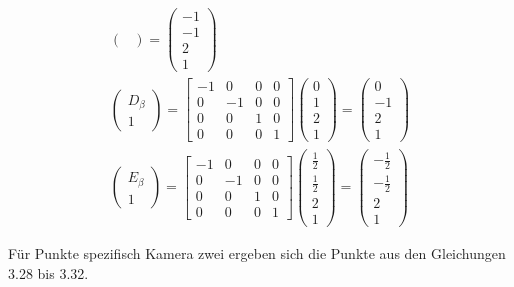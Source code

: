 \begin{gather}
\begin{pmatrix}
	\end{pmatrix}
	=
	\begin{pmatrix}
		-1\\-1\\2\\1
	\end{pmatrix}\\
	\begin{pmatrix}
		D_\beta\\1
	\end{pmatrix}
	=
	\begin{bmatrix}
		-1&0&0&0\\
		0&-1&0&0\\
		0&0&1&0\\
		0&0&0&1
	\end{bmatrix}
	\begin{pmatrix}
		0\\1\\2\\1
	\end{pmatrix}
	=
	\begin{pmatrix}
		0\\-1\\2\\1
	\end{pmatrix}\\
	\begin{pmatrix}
		E_\beta\\1
	\end{pmatrix}
	=
	\begin{bmatrix}
		-1&0&0&0\\
		0&-1&0&0\\
		0&0&1&0\\
		0&0&0&1
	\end{bmatrix}
	\begin{pmatrix}
		\frac{1}{2}\\\frac{1}{2}\\2\\1
	\end{pmatrix}
	=
	\begin{pmatrix}
		-\frac{1}{2}\\-\frac{1}{2}\\2\\1
	\end{pmatrix}
\end{gather}

Für Punkte spezifisch Kamera zwei ergeben sich die Punkte aus den Gleichungen 3.28 bis 3.32.

